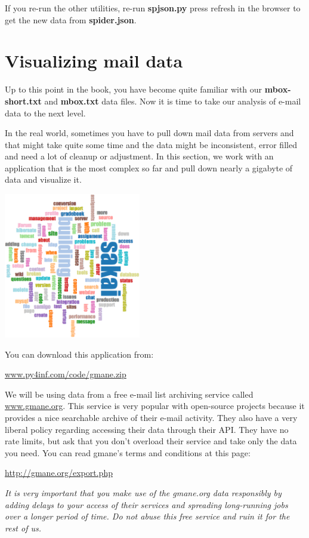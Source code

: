 \documentclass[11pt]{book}
\begin{document}
If you re-run the other utilities, re-run {\bf spjson.py} 
press refresh in the browser to get the new data from {\bf spider.json}.

\section{Visualizing mail data}

Up to this point in the book, you have become quite familiar with our 
{\bf mbox-short.txt} and {\bf mbox.txt} data files.   Now it is time to take
our analysis of e-mail data to the next level.  

In the real world, sometimes you have to pull down mail data from servers
and that might take quite some time and the data might be inconsistent, 
error filled and need a lot of cleanup or adjustment.  In this section, we
work with an application that is the most complex so far and pull down nearly a 
gigabyte of data and visualize it.

\beforefig
\centerline{\includegraphics[height=2.50in]{figs2/wordcloud.eps}}
\afterfig

You can download this application from:

\url{www.py4inf.com/code/gmane.zip}

We will be using data from a free e-mail list archiving service called 
\url{www.gmane.org}.  This service is very popular with open-source
projects because it provides a nice searchable archive of their 
e-mail activity.  They also have a very liberal policy regarding accessing 
their data through their API.  They have no rate limits, but ask that you 
don't overload their service and take only the data you need.  You can read
gmane's terms and conditions at this page:

\url{http://gmane.org/export.php}

{\em It is very important that you make use of the gmane.org data
responsibly by adding delays to your access of their services and spreading
long-running jobs over a longer period of time.  Do not abuse this free service
and ruin it for the rest of us.}
\end{document}
